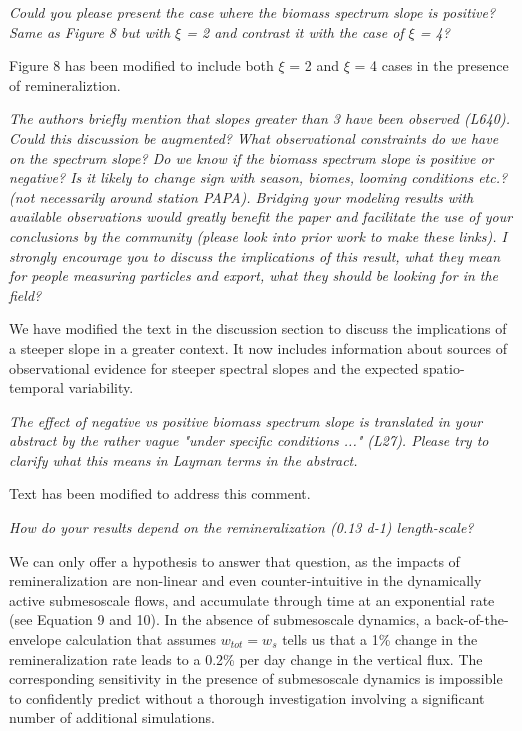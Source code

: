 \documentclass[12pt,letter]{article}
\begin{document}
\textit{Could you please present the case where the biomass spectrum slope is positive? Same as Figure 8 but with $\xi$ = 2 and contrast it with the case of $\xi$ = 4?\\}

{\color{blue}
Figure 8 has been modified to include both $\xi$ = 2 and $\xi$ = 4 cases in the presence of remineraliztion.\\}

\textit{The authors briefly mention that slopes greater than 3 have been observed (L640). Could this discussion be augmented? What observational constraints do we have on the spectrum slope? Do we know if the biomass spectrum slope is positive or negative? Is it likely to change sign with season, biomes, looming conditions etc.? (not necessarily around station PAPA). Bridging your modeling results with available observations would greatly benefit the paper and facilitate the use of your conclusions by the community (please look into prior work to make these links). I strongly encourage you to discuss the implications of this result, what they mean for people measuring particles and export, what they should be looking for in the field?}

{\color{blue}
	We have modified the text in the discussion section to discuss the implications of a steeper slope in a greater context. It now includes information about sources of observational evidence for steeper spectral slopes and the expected spatio-temporal variability.\\}

\textit{The effect of negative vs positive biomass spectrum slope is translated in your abstract by the rather vague "under specific conditions ..." (L27). Please try to clarify what this means in Layman terms in the abstract.}

{\color{blue}Text has been modified to address this comment.\\}

\textit{How do your results depend on the remineralization (0.13 d-1) length-scale? \\}

{\color{blue} We can only offer a hypothesis to answer that question, as the impacts of remineralization are non-linear and even counter-intuitive in the dynamically active submesoscale flows, and accumulate through time at an exponential rate (see Equation 9 and 10). In the absence of submesoscale dynamics, a back-of-the-envelope calculation that assumes $w_{tot} = w_{s}$ tells us that a  1\% change in the remineralization rate leads to a 0.2\% per day change in the vertical flux. The corresponding sensitivity in the presence of submesoscale dynamics is impossible to confidently predict without a thorough investigation involving a significant number of additional simulations.\\}
\end{document}
